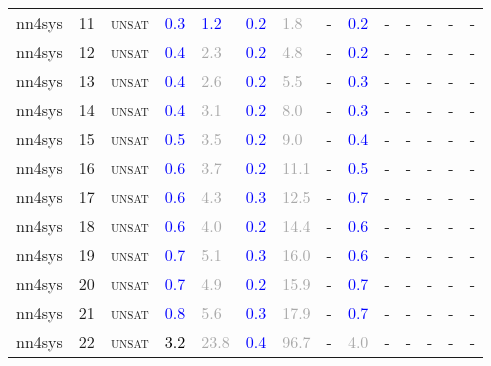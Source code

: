 \begin{center}
{\begin{longtable}{@{}llllllllllllll@{}}
nn4sys & 11 & \textsc{unsat} & \textcolor{blue}{0.3} & \textcolor{blue}{1.2} & \textcolor{blue}{0.2} & \textcolor{darkgray}{1.8} & - & \textcolor{blue}{0.2} & - & - & - & - & - \\
nn4sys & 12 & \textsc{unsat} & \textcolor{blue}{0.4} & \textcolor{darkgray}{2.3} & \textcolor{blue}{0.2} & \textcolor{darkgray}{4.8} & - & \textcolor{blue}{0.2} & - & - & - & - & - \\
nn4sys & 13 & \textsc{unsat} & \textcolor{blue}{0.4} & \textcolor{darkgray}{2.6} & \textcolor{blue}{0.2} & \textcolor{darkgray}{5.5} & - & \textcolor{blue}{0.3} & - & - & - & - & - \\
nn4sys & 14 & \textsc{unsat} & \textcolor{blue}{0.4} & \textcolor{darkgray}{3.1} & \textcolor{blue}{0.2} & \textcolor{darkgray}{8.0} & - & \textcolor{blue}{0.3} & - & - & - & - & - \\
nn4sys & 15 & \textsc{unsat} & \textcolor{blue}{0.5} & \textcolor{darkgray}{3.5} & \textcolor{blue}{0.2} & \textcolor{darkgray}{9.0} & - & \textcolor{blue}{0.4} & - & - & - & - & - \\
nn4sys & 16 & \textsc{unsat} & \textcolor{blue}{0.6} & \textcolor{darkgray}{3.7} & \textcolor{blue}{0.2} & \textcolor{darkgray}{11.1} & - & \textcolor{blue}{0.5} & - & - & - & - & - \\
nn4sys & 17 & \textsc{unsat} & \textcolor{blue}{0.6} & \textcolor{darkgray}{4.3} & \textcolor{blue}{0.3} & \textcolor{darkgray}{12.5} & - & \textcolor{blue}{0.7} & - & - & - & - & - \\
nn4sys & 18 & \textsc{unsat} & \textcolor{blue}{0.6} & \textcolor{darkgray}{4.0} & \textcolor{blue}{0.2} & \textcolor{darkgray}{14.4} & - & \textcolor{blue}{0.6} & - & - & - & - & - \\
nn4sys & 19 & \textsc{unsat} & \textcolor{blue}{0.7} & \textcolor{darkgray}{5.1} & \textcolor{blue}{0.3} & \textcolor{darkgray}{16.0} & - & \textcolor{blue}{0.6} & - & - & - & - & - \\
nn4sys & 20 & \textsc{unsat} & \textcolor{blue}{0.7} & \textcolor{darkgray}{4.9} & \textcolor{blue}{0.2} & \textcolor{darkgray}{15.9} & - & \textcolor{blue}{0.7} & - & - & - & - & - \\
nn4sys & 21 & \textsc{unsat} & \textcolor{blue}{0.8} & \textcolor{darkgray}{5.6} & \textcolor{blue}{0.3} & \textcolor{darkgray}{17.9} & - & \textcolor{blue}{0.7} & - & - & - & - & - \\
nn4sys & 22 & \textsc{unsat} & \textcolor{black}{3.2} & \textcolor{darkgray}{23.8} & \textcolor{blue}{0.4} & \textcolor{darkgray}{96.7} & - & \textcolor{darkgray}{4.0} & - & - & - & - & - \\

\end{longtable}}
\end{center}
